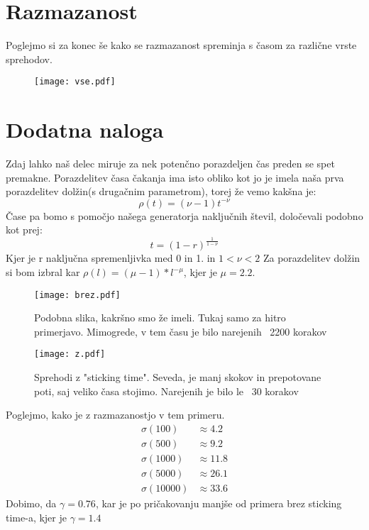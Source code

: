 \documentclass{article}
\begin{document}
\section{Razmazanost}

Poglejmo si za konec še kako se razmazanost spreminja s časom za različne vrste sprehodov.

\begin{figure}[H]
\texttt{[image: vse.pdf]}
\end{figure}

\section{Dodatna naloga}

Zdaj lahko naš delec miruje za nek potenčno porazdeljen čas preden se spet premakne.
Porazdelitev časa čakanja ima isto obliko kot jo je imela naša prva porazdelitev dolžin(s drugačnim parametrom), torej že vemo kakšna je:
\begin{equation*}
\rho(t) =(\nu-1)t^{-\nu}
\end{equation*}
Čase pa bomo s pomočjo našega generatorja naključnih števil, določevali podobno kot prej:
\begin{equation*}
t = (1-r)^{\frac{1}{1-\nu}}
\end{equation*}
Kjer je r naključna spremenljivka med 0 in 1. in $1<\nu<2$
Za porazdelitev dolžin si bom izbral kar $\rho(l) = (\mu-1)*l^{-\mu}$, kjer je $\mu=2.2$.

\begin{figure}[H]
\texttt{[image: brez.pdf]}
\caption*{Podobna slika, kakršno smo že imeli. Tukaj samo za hitro primerjavo. Mimogrede, v tem času je bilo narejenih ~2200 korakov}
\end{figure}
\begin{figure}[H]
\texttt{[image: z.pdf]}
\caption*{Sprehodi z "sticking time". Seveda, je manj skokov in prepotovane poti, saj veliko časa stojimo. Narejenih je bilo le ~30 korakov}
\end{figure}

Poglejmo, kako je z razmazanostjo v tem primeru.
\begin{align*}
\sigma(100) &\approx 4.2 \\
\sigma(500) &\approx 9.2 \\
\sigma(1000) &\approx 11.8 \\
\sigma(5000) &\approx 26.1 \\
\sigma(10000) &\approx 33.6
\end{align*}
Dobimo, da $\gamma = 0.76$, kar je po pričakovanju manjše od primera brez sticking time-a, kjer je $\gamma = 1.4$
\end{document}
